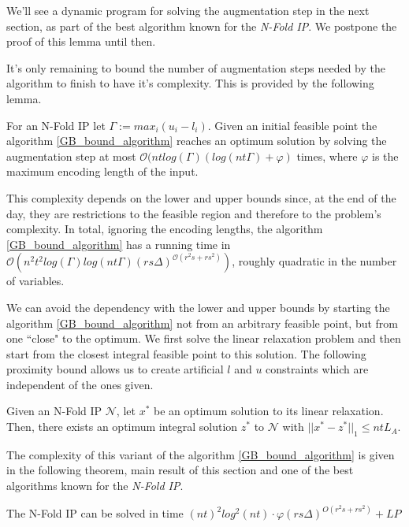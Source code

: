 We'll see a dynamic program for solving the augmentation step in the next section, as part of the best algorithm known for the \emph{N-Fold IP}. We postpone the proof of this lemma until then.

It's only remaining to bound the number of augmentation steps needed by the algorithm to finish to have it's complexity. This is provided by the following lemma.

\begin{lemma}
For an N-Fold IP let $\Gamma := max_i(u_i - l_i)$. Given an initial feasible point the algorithm \ref{GB_bound_algorithm}  reaches an optimum solution by solving the augmentation step at most $\mathcal{O}(nt log(\Gamma)(log(nt\Gamma)+\varphi)$ times, where $\varphi$ is the maximum encoding length of the input.  
\end{lemma}

This complexity depends on the lower and upper bounds since, at the end of the day, they are restrictions to the feasible region and therefore to the problem's complexity. In total, ignoring the encoding lengths, the algorithm \ref{GB_bound_algorithm} has a running time in $\mathcal{O}(n^2t^2 log(\Gamma)log(nt\Gamma)(rs\Delta)^{\mathcal{O}(r^2s+rs^2)})$, roughly quadratic in the number of variables.


We can avoid the dependency with the lower and upper bounds by starting the algorithm \ref{GB_bound_algorithm} not from an arbitrary feasible point, but from one ``close" to the optimum. We first solve the linear relaxation problem and then start from the closest integral feasible point to this solution. The following proximity bound allows us to create artificial $l$ and $u$ constraints which are independent of the ones given.

\begin{lemma}
Given an N-Fold IP $\mathcal{N}$, let $x^*$ be an optimum solution to its linear relaxation. Then, there exists an optimum integral
solution $z^*$ to $\mathcal{N}$ with $||x^* - z^*||_1 \leq ntL_A$.
\end{lemma}

The complexity of this variant of the algorithm \ref{GB_bound_algorithm} is given in the following theorem, main result of this section and one of the best algorithms known for the \emph{N-Fold IP}.

\begin{theorem}
    The N-Fold IP can be solved in time $(nt)^2 log^2(nt) \cdot \varphi (rs\Delta)^{O(r^2s + rs^2)} + LP$
\end{theorem}
        